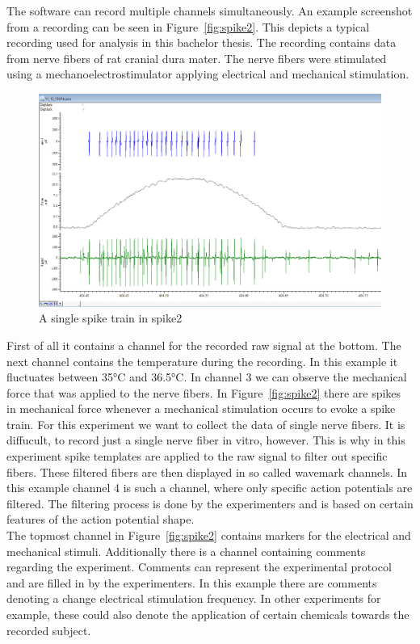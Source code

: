 The software can record multiple channels simultaneously. An example screenshot from a recording can be seen in Figure~\ref{fig:spike2}. This depicts a typical recording used for analysis in this bachelor thesis. The recording contains data from nerve fibers of rat cranial dura mater. The nerve fibers were stimulated using a mechanoelectrostimulator applying electrical and mechanical stimulation. 

\begin{figure}
	\includegraphics[width = \textwidth]{src/pic/Spike2_spike_train}
	\caption{A single spike train in spike2}
	\label{fig:spike_train}
\end{figure}

First of all it contains a channel for the recorded raw signal at the bottom. The next channel contains the temperature during the recording. In this example it fluctuates between 35°C and 36.5°C. In channel 3 we can observe the mechanical force that was applied to the nerve fibers. In Figure~\ref{fig:spike2} there are spikes in mechanical force whenever a mechanical stimulation occurs to evoke a spike train. For this experiment we want to collect the data of single nerve fibers. It is diffucult, to record just a single nerve fiber in vitro, however. This is why in this experiment spike templates are applied to the raw signal to filter out specific fibers. These filtered fibers are then displayed in so called wavemark channels. In this example channel 4 is such a channel, where only specific action potentials are filtered. The filtering process is done by the experimenters and is based on certain features of the action potential shape.\\
The topmost channel in Figure~\ref{fig:spike2} contains markers for the electrical and mechanical stimuli. Additionally there is a channel containing comments regarding the experiment. Comments can represent the experimental protocol and are filled in by the experimenters. In this example there are comments denoting a change electrical stimulation frequency. In other experiments for example, these could also denote the application of certain chemicals towards the recorded subject.

